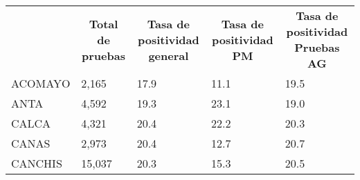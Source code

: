\begin{tabular}{lllll}
	\rowcolor[HTML]{DDEBF7} 
	\multicolumn{1}{c}{\cellcolor[HTML]{DDEBF7}\textbf{PROVINCIA}} & \multicolumn{1}{c}{\cellcolor[HTML]{DDEBF7}\textbf{Total de pruebas}} & \multicolumn{1}{c}{\cellcolor[HTML]{DDEBF7}\textbf{Tasa de positividad general}} & \multicolumn{1}{c}{\cellcolor[HTML]{DDEBF7}\textbf{Tasa de positividad PM}} & \multicolumn{1}{c}{\cellcolor[HTML]{DDEBF7}\textbf{Tasa de positividad Pruebas AG}} \\
	\cellcolor[HTML]{FF5050}ACOMAYO                                & 2,165                                                                 & 17.9                                                                             & 11.1                                                                        & 19.5                                                                                \\
	\cellcolor[HTML]{FF5050}ANTA                                   & 4,592                                                                 & 19.3                                                                             & 23.1                                                                        & 19.0                                                                                \\
	\cellcolor[HTML]{FF5050}CALCA                                  & 4,321                                                                 & 20.4                                                                             & 22.2                                                                        & 20.3                                                                                \\
	\cellcolor[HTML]{FF5050}CANAS                                  & 2,973                                                                 & 20.4                                                                             & 12.7                                                                        & 20.7                                                                                \\
	\cellcolor[HTML]{FF5050}CANCHIS                                & 15,037                                                                & 20.3                                                                             & 15.3                                                                        & 20.5                                                                                \\

\end{tabular}
